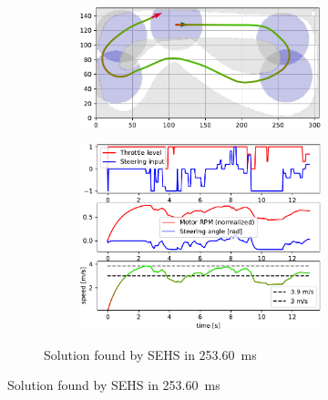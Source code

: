 \begin{figure}[!tbp]
	\begin{subfigure}[t]{\textwidth}
		\begin{subfigure}[c]{0.49\textwidth}
			\includegraphics[width=\textwidth]{../img/experiments/porto_sehs_trajectory}
		\end{subfigure}
		\hfill
		\begin{subfigure}[c]{0.49\textwidth}
			\includegraphics[width=\textwidth]{../img/experiments/porto_sehs_actuators}
		\end{subfigure}
		\caption{Solution found by SEHS in \SI{253.60}{\milli\second}}
		\label{fig:solution_porto-sehs}
	\end{subfigure}
	
	\vspace{0.75cm}
	

\end{figure}
